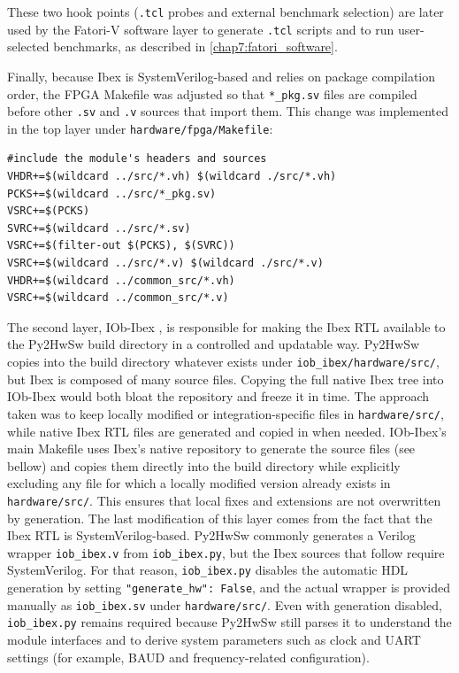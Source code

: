  These two hook points (\texttt{.tcl} probes and external benchmark selection) are later used by the \ac{Fatori-V} software layer to generate \texttt{.tcl} scripts and to run user-selected benchmarks, as described in \cref{chap7:fatori_software}.

 Finally, because Ibex is SystemVerilog-based and relies on package compilation order, the FPGA Makefile was adjusted so that \texttt{*\_pkg.sv} files are compiled before other \texttt{.sv} and \texttt{.v} sources that import them. This change was implemented in the top layer under \texttt{hardware/fpga/Makefile}:
\begin{lstlisting}[language=matlabfloz,caption={Portion of the new hardware/fpga/Makefile (source ordering)}]
#include the module's headers and sources
VHDR+=$(wildcard ../src/*.vh) $(wildcard ./src/*.vh)
PCKS+=$(wildcard ../src/*_pkg.sv)
VSRC+=$(PCKS)
SVRC+=$(wildcard ../src/*.sv)
VSRC+=$(filter-out $(PCKS), $(SVRC))
VSRC+=$(wildcard ../src/*.v) $(wildcard ./src/*.v)
VHDR+=$(wildcard ../common_src/*.vh)
VSRC+=$(wildcard ../common_src/*.v)
\end{lstlisting}

\vspace{2mm}
The second layer, IOb-Ibex \cite{iob-ibex}, is responsible for making the Ibex \ac{RTL} available to the Py2HwSw build directory in a controlled and updatable way. Py2HwSw copies into the build directory whatever exists under \texttt{iob\_ibex/hardware/src/}, but Ibex is composed of many source files. Copying the full native Ibex tree into IOb-Ibex would both bloat the repository and freeze it in time. The approach taken was to keep locally modified or integration-specific files in \texttt{hardware/src/}, while native Ibex \ac{RTL} files are generated and copied in when needed. IOb-Ibex's main Makefile uses Ibex's native repository to generate the source files (see bellow) and copies them directly into the build directory while explicitly excluding any file for which a locally modified version already exists in \texttt{hardware/src/}. This ensures that local fixes and extensions are not overwritten by generation. The last modification of this layer comes from the fact that the Ibex \ac{RTL} is SystemVerilog-based. Py2HwSw commonly generates a Verilog wrapper \texttt{iob\_ibex.v} from \texttt{iob\_ibex.py}, but the Ibex sources that follow require SystemVerilog. For that reason, \texttt{iob\_ibex.py} disables the automatic HDL generation by setting \texttt{"generate\_hw": False}, and the actual wrapper is provided manually as \texttt{iob\_ibex.sv} under \texttt{hardware/src/}. Even with generation disabled, \texttt{iob\_ibex.py} remains required because Py2HwSw still parses it to understand the module interfaces and to derive system parameters such as clock and UART settings (for example, BAUD and frequency-related configuration).
 
